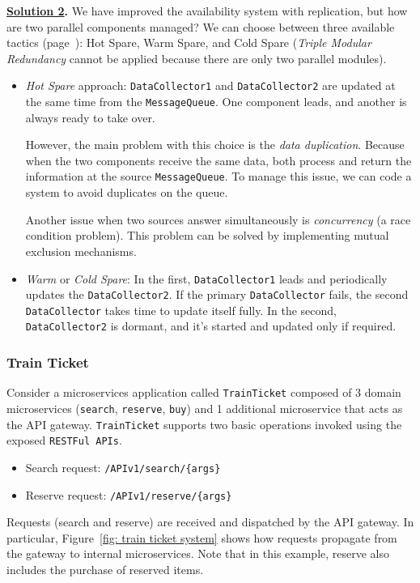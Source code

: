 \highspace
\textbf{\underline{Solution 2}.} We have improved the availability system with replication, but how are two parallel components managed? We can choose between three available tactics (page~\pageref{Replication approaches}): Hot Spare, Warm Spare, and Cold Spare (\emph{Triple Modular Redundancy} cannot be applied because there are only two parallel modules).
\begin{itemize}
    \item \emph{Hot Spare} approach: \texttt{DataCollector1} and \texttt{DataCollector2} are updated at the same time from the \texttt{MessageQueue}. One component leads, and another is always ready to take over.
    
    However, the main problem with this choice is the \emph{data duplication}. Because when the two components receive the same data, both process and return the information at the source \texttt{MessageQueue}. To manage this issue, we can code a system to avoid duplicates on the queue. 
    
    Another issue when two sources answer simultaneously is \emph{concurrency} (a race condition problem). This problem can be solved by implementing mutual exclusion mechanisms.


    \item \emph{Warm} or \emph{Cold Spare}: In the first, \texttt{DataCollector1} leads and periodically updates the \texttt{DataCollector2}. If the primary \texttt{DataCollector} fails, the second \texttt{DataCollector} takes time to update itself fully. In the second, \texttt{DataCollector2} is dormant, and it's started and updated only if required.
\end{itemize}

\newpage

\subsubsection{Train Ticket}

\descriptionproblem
Consider a microservices application called \texttt{TrainTicket} composed of 3 domain microservices (\texttt{search}, \texttt{reserve}, \texttt{buy}) and 1 additional microservice that acts as the API gateway. \texttt{TrainTicket} supports two basic operations invoked using the exposed \texttt{RESTFul APIs}.
\begin{itemize}
    \item Search request: \texttt{/APIv1/search/\{args\}}
    \item Reserve request: \texttt{/APIv1/reserve/\{args\}}
\end{itemize}
Requests (search and reserve) are received and dispatched by the API gateway. In particular, Figure~\ref{fig: train ticket system} shows how requests propagate from the gateway to internal microservices. Note that in this example, reserve also includes the purchase of reserved items.

